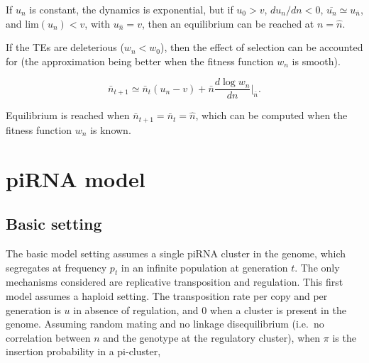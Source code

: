 \documentclass[10pt,a4paper]{article}
\begin{document}
If $u_n$ is constant, the dynamics is exponential, but if $u_0 > v$, $d u_n / d n < 0$, $\overline{u_n} \simeq u_{\bar n}$, and $\mathrm{lim} (u_n) < v$, with $u_{\hat n} = v$, then an equilibrium can be reached at $n = \hat n$. 

If the TEs are deleterious ($w_n < w_0$), then the effect of selection can be accounted for (the approximation being better when the fitness function $w_n$ is smooth). 

\begin{equation}\label{eq:cc2}
\bar n_{t+1} \simeq \bar n_t(u_n - v) + \bar n \frac{d \log w_n}{d n} \Bigr|_{\bar n}.
\end{equation}

Equilibrium is reached when $\bar n_{t+1} = \bar n_t = \hat n$, which can be computed when the fitness function $w_n$ is known. 



\section{piRNA model}

\subsection{Basic setting} 

The basic model setting assumes a single piRNA cluster in the genome, which segregates at frequency $p_t$ in an infinite population at generation $t$. The only mechanisms considered are replicative transposition and regulation. This first model assumes a haploid setting. The transposition rate per copy and per generation is $u$ in absence of regulation, and $0$ when a cluster is present in the genome. Assuming random mating and no linkage disequilibrium (i.e.\ no correlation between $n$ and the genotype at the regulatory cluster), when $\pi$ is the insertion probability in a pi-cluster,
\end{document}
